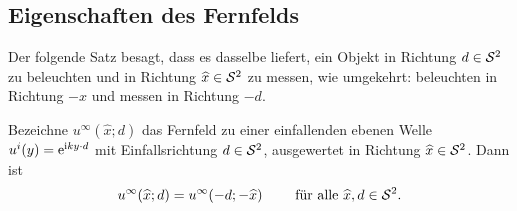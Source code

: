 \setcounter{subsection}{8}
\setcounter{section}{9}
\setcounter{mydef}{0}
\setcounter{equation}{0}

\subsection{Eigenschaften des Fernfelds}
Der folgende Satz besagt, dass es dasselbe liefert, ein Objekt in Richtung \(d\in\mathcal{S}^2\) zu beleuchten und in Richtung \(\widehat{x}\in\mathcal{S}^2\) zu messen, wie umgekehrt: beleuchten in Richtung \(-\widehat{x}\) und messen in Richtung \(-d\).
\begin{satz}[Reziprozitätsprinzip]\label{satz: reziprozitätsprinzip}
	Bezeichne \(u^\infty(\widehat{x};d)\) das Fernfeld zu einer einfallenden ebenen Welle \(u^i(y)=\mathrm{e}^{\mathrm{i} ky\cdot d}\) mit Einfallsrichtung \(d\in\mathcal{S}^2\), ausgewertet in Richtung \(\widehat{x}\in\mathcal{S}^2\). Dann ist
	\begin{equation}
		\label{reziprozitätsprinzip}
		u^\infty(\widehat{x};d)=u^\infty(-d;-\widehat{x})\qquad\text{ für alle }\widehat{x},d\in\mathcal{S}^2.
	\end{equation}
\end{satz}
